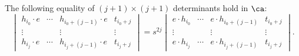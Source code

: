 \begin{lemma} \label{lem:homfly4}
The following equality of $(j+1) \times (j+1)$ determinants hold in $\ca$:
\[
\begin{vmatrix}
h_{i_0} \cdot e & \cdots & h_{i_0 + (j-1)} \cdot e & t_{i_0 + j} \\
\vdots & & \vdots & \vdots \\
h_{i_j} \cdot e & \cdots & h_{i_j + (j-1)} \cdot e & t_{i_j + j}
\end{vmatrix}
= s^{2j}
\begin{vmatrix}
e \cdot h_{i_0} & \cdots & e \cdot h_{i_0 + (j-1)} & t_{i_0 + j} \\
\vdots & & \vdots & \vdots \\
e \cdot h_{i_j} & \cdots & e \cdot h_{i_j + (j-1)} & t_{i_j + j}
\end{vmatrix}.
\]
\end{lemma}

